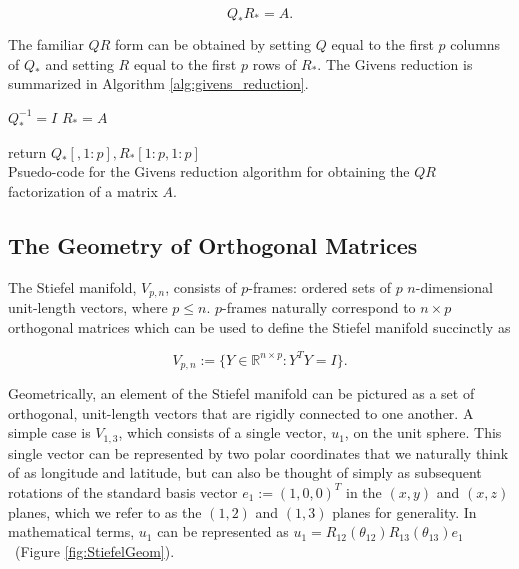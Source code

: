 \documentclass[ba]{imsart}
\numberwithin{equation}{section}
\theoremstyle{plain}
\begin{document}
\begin{equation}
Q_* R_* = A.
\end{equation}

\noindent The familiar $QR$ form can be obtained by setting $Q$ equal to the first $p$ columns of $Q_*$ and setting $R$ equal to the first $p$ rows of $R_*$. The Givens reduction is summarized in Algorithm \ref{alg:givens_reduction}.

\begin{algorithm}[h]
\SetAlgoLined
{}
 $Q_*^{-1} = I$
  $R_* = A$
 
return $Q_*[,1:p], R_*[1:p,1:p]$
\\
\caption{Psuedo-code for the Givens reduction algorithm for obtaining the $QR$ factorization of a matrix $A$.}
 \label{alg:givens_reduction}
\end{algorithm}

\subsection{The Geometry of Orthogonal Matrices}\label{givens_stiefel_geometry}
The Stiefel manifold, $V_{p,n}$,  consists of $p$-frames: ordered sets of $p$ $n$-dimensional unit-length vectors, where $p \le n$. $p$-frames naturally correspond to $n \times p$ orthogonal matrices which can be used to define the Stiefel manifold succinctly as

\begin{equation}
V_{p,n} := \{Y \in \mathbb{R}^{n \times p}: Y^TY = I \}.
\end{equation}

\noindent Geometrically, an element of the Stiefel manifold can be pictured as a set of orthogonal, unit-length vectors that are rigidly connected to one another. A simple case is $V_{1,3}$, which consists of a single vector, $u_1$, on the unit sphere. This single vector can be represented by two polar coordinates that we naturally think of as longitude and latitude, but can also be thought of simply as subsequent rotations of the standard basis vector $e_1 := (1,0,0)^T$ in the $(x,y)$ and $(x,z)$ planes, which we refer to as the $(1,2)$ and $(1,3)$ planes for generality. In mathematical terms, $u_1$ can be represented as $u_1 = R_{12}(\theta_{12}) R_{13}(\theta_{13}) e_1$~(Figure \ref{fig:StiefelGeom}). 
\end{document}
